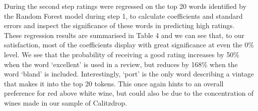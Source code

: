 \documentclass[11pt,preprint]{elsarticle}
\numberwithin{equation}{section}
\numberwithin{figure}{section}
\numberwithin{table}{section}
\begin{document}
During the second step ratings were regressed on the top 20 words
identified by the Random Forest model during step 1, to calculate
coefficients and standard errors and inspect the significance of these
words in predicting high ratings. These regression results are
summarised in Table 4 and we can see that, to our satisfaction, most of
the coefficients display with great significance at even the 0\% level.
We see that the probability of receiving a good rating increases by 50\%
when the word `excellent' is used in a review, but reduces by 168\% when
the word `bland' is included. Interestingly, `port' is the only word
describing a vintage that makes it into the top 20 tokens. This once
again hints to an overall preference for red above white wine, but could
also be due to the concentration of wines made in our sample of
Calitzdrop.
\end{document}
